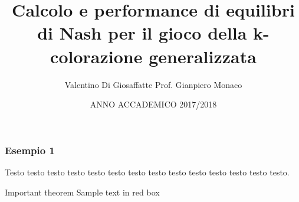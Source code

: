 \documentclass{beamer}
\title{Calcolo e performance di equilibri di Nash per il gioco della k-colorazione generalizzata}
\author{Valentino Di Giosaffatte \hfill Prof. Gianpiero Monaco}
\institute{Università degli Studi dell'Aquila}
\date{ANNO ACCADEMICO 2017/2018}
\begin{document}
\frame{\titlepage}

\begin{frame}

\frametitle{Esempio 1}

Testo testo \alert{testo} testo testo testo testo testo testo testo testo testo testo testo.\\
 
\begin{alertblock}{Important theorem}
Sample text in red box
\end{alertblock}
 

\end{frame}
\end{document}
